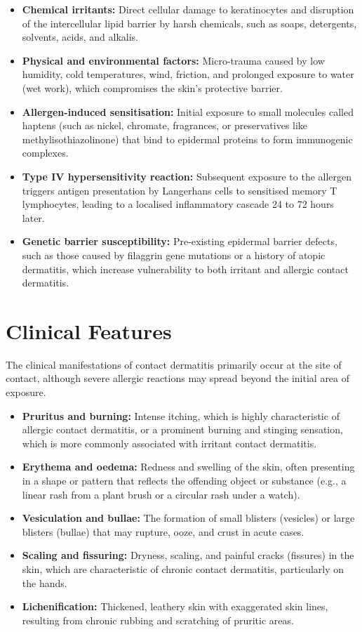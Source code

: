 \begin{itemize}
    \item \textbf{Chemical irritants:} Direct cellular damage to keratinocytes and disruption of the intercellular lipid barrier by harsh chemicals, such as soaps, detergents, solvents, acids, and alkalis.
    \item \textbf{Physical and environmental factors:} Micro-trauma caused by low humidity, cold temperatures, wind, friction, and prolonged exposure to water (wet work), which compromises the skin's protective barrier.
    \item \textbf{Allergen-induced sensitisation:} Initial exposure to small molecules called haptens (such as nickel, chromate, fragrances, or preservatives like methylisothiazolinone) that bind to epidermal proteins to form immunogenic complexes.
    \item \textbf{Type IV hypersensitivity reaction:} Subsequent exposure to the allergen triggers antigen presentation by Langerhans cells to sensitised memory T lymphocytes, leading to a localised inflammatory cascade 24 to 72 hours later.
    \item \textbf{Genetic barrier susceptibility:} Pre-existing epidermal barrier defects, such as those caused by filaggrin gene mutations or a history of atopic dermatitis, which increase vulnerability to both irritant and allergic contact dermatitis.
\end{itemize}

\section*{Clinical Features}
The clinical manifestations of contact dermatitis primarily occur at the site of contact, although severe allergic reactions may spread beyond the initial area of exposure.

\begin{itemize}
    \item \textbf{Pruritus and burning:} Intense itching, which is highly characteristic of allergic contact dermatitis, or a prominent burning and stinging sensation, which is more commonly associated with irritant contact dermatitis.
    \item \textbf{Erythema and oedema:} Redness and swelling of the skin, often presenting in a shape or pattern that reflects the offending object or substance (e.g., a linear rash from a plant brush or a circular rash under a watch).
    \item \textbf{Vesiculation and bullae:} The formation of small blisters (vesicles) or large blisters (bullae) that may rupture, ooze, and crust in acute cases.
    \item \textbf{Scaling and fissuring:} Dryness, scaling, and painful cracks (fissures) in the skin, which are characteristic of chronic contact dermatitis, particularly on the hands.
    \item \textbf{Lichenification:} Thickened, leathery skin with exaggerated skin lines, resulting from chronic rubbing and scratching of pruritic areas.
\end{itemize}

